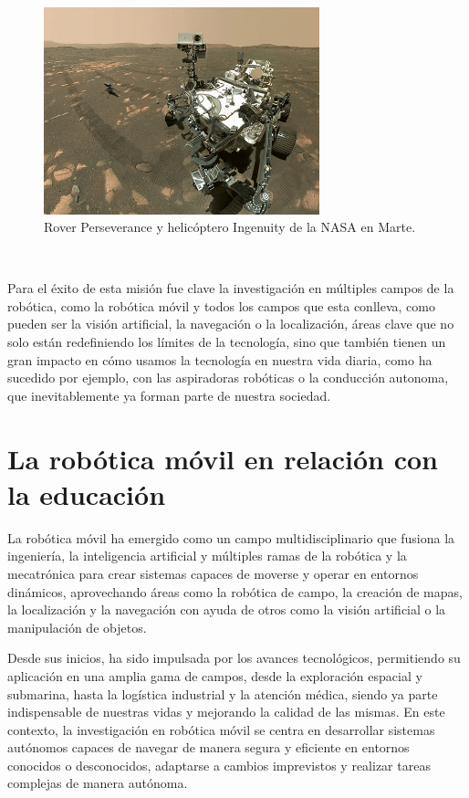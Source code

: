 \begin{figure} [h!]
  \begin{center}
    \includegraphics[width=8cm]{figs/perseverance_and_ingenuity_mars_rover_selfie}
  \end{center}
  \caption{Rover Perseverance y helicóptero Ingenuity de la NASA en Marte.}
  \label{fig:rover}
\end{figure}\

Para el éxito de esta misión fue clave la investigación en múltiples campos de
la robótica, como la robótica móvil y todos los campos que esta conlleva, como
pueden ser la visión artificial, la navegación o la localización, áreas clave
que no solo están redefiniendo los límites de la tecnología, sino que también
tienen un gran impacto en cómo usamos la tecnología en nuestra vida diaria, como
ha sucedido por ejemplo, con las aspiradoras robóticas o la conducción
autonoma, que inevitablemente ya forman parte de nuestra sociedad.



\section{La robótica móvil en relación con la educación}
\label{sec:robotica_movil} %

La robótica móvil ha emergido como un campo multidisciplinario que fusiona la
ingeniería, la inteligencia artificial y múltiples ramas de la robótica y la
mecatrónica para crear sistemas capaces de moverse y operar en entornos
dinámicos, aprovechando áreas como la robótica de campo, la creación de mapas,
la localización y la navegación con ayuda de otros como la visión artificial o
la manipulación de objetos.

Desde sus inicios, ha sido impulsada por los avances tecnológicos, permitiendo
su aplicación en una amplia gama de campos, desde la exploración espacial y
submarina, hasta la logística industrial y la atención médica, siendo ya parte
indispensable de nuestras vidas y mejorando la calidad de las mismas.
En este contexto, la investigación en robótica móvil se centra en desarrollar
sistemas autónomos capaces de navegar de manera segura y eficiente en entornos
conocidos o desconocidos, adaptarse a cambios imprevistos y realizar tareas
complejas de manera autónoma.

